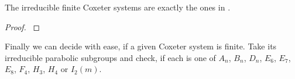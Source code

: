 \begin{theo}
	\label{irreducible-finit-coxeter-systems}
	The irreducible finite Coxeter systems are exactly the ones in .

	\begin{proof}
		\cite[Theorem 6.4]{humphreys:coxeter}
	\end{proof}
\end{theo}

Finally we can decide with ease, if a given Coxeter system is finite. Take its irreducible parabolic subgroups and check, if each is one of $A_n$, $B_n$, $D_n$, $E_6$, $E_7$, $E_8$, $F_4$, $H_3$, $H_4$ or $I_2(m)$.

